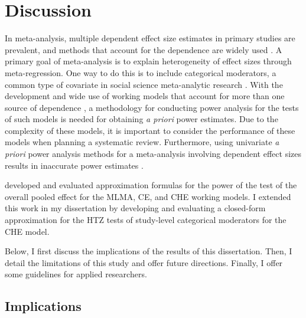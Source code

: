 \chapter{Discussion}\label{ch: discussion}

In meta-analysis, multiple dependent effect size estimates in primary studies are prevalent, and methods that account for the dependence are widely used \autocite{hedges2010, pustejovsky2022, vandennoortgate2013, vandennoortgate2015, betsy_jane_becker_model}. A primary goal of meta-analysis is to explain heterogeneity of effect sizes through meta-regression. One way to do this is to include categorical moderators, a common type of covariate in social science meta-analytic research \autocite{tipton2019a}. With the development and wide use of working models that account for more than one source of dependence \autocite{pustejovsky2022}, a methodology for conducting power analysis for the tests of such models is needed for obtaining \textit{a priori} power estimates. Due to the complexity of these models, it is important to consider the performance of these models when planning a systematic review. Furthermore, using univariate \textit{a priori} power analysis methods \autocite{hedges2001} for a meta-analysis involving dependent effect sizes results in inaccurate power estimates \autocite{vembye2023}.  

\textcite{vembye2023} developed and evaluated approximation formulas for the power of the test of the overall pooled effect for the MLMA, CE, and CHE working models. I extended this work in my dissertation by developing and evaluating a closed-form approximation for the HTZ tests of study-level categorical moderators for the CHE model.  

Below, I first discuss the implications of the results of this dissertation.  Then, I detail the limitations of this study and offer future directions.  Finally, I offer some guidelines for applied researchers.

\section{Implications}


